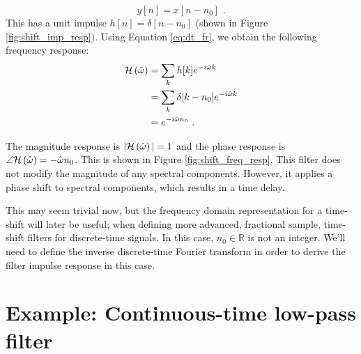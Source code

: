 \begin{equation}
y[n] = x[n-n_0] \,\,.
\end{equation}
This has a unit impulse $h[n]=\delta[n-n_0]$ (shown in
Figure \ref{fig:shift_imp_resp}). Using Equation \ref{eq:dt_fr}, we
obtain the following frequency response:
\begin{align}
\mathcal{H}\left(\hat{\omega}\right) & = \sum_k h[k] e^{-i\hat{\omega}k}\\
    & = \sum_k \delta[k-n_0] e^{-i\hat{\omega}k}\\
    & = e^{-i\hat{\omega}n_0} \,\,.
\end{align}

The magnitude response is $|\mathcal{H}\left(\hat{\omega}\right)|=1$ and the phase response is
$\angle \mathcal{H}\left(\hat{\omega}\right) = -\hat{\omega}n_0$. This is shown in
Figure \ref{fig:shift_freq_resp}. This filter does not modify the
magnitude of any spectral components. However, it applies a phase
shift to spectral components, which results in a time delay.


This may seem trivial now, but the frequency domain representation for
a time-shift will later be useful; when defining more advanced,
fractional sample, time-shift filters for discrete-time signals. In
this case, $n_0 \in \mathbb{R}$ is not an integer. We'll need to
define the inverse discrete-time Fourier transform in order to derive
the filter impulse response in this case.


\section{Example: Continuous-time low-pass filter}


